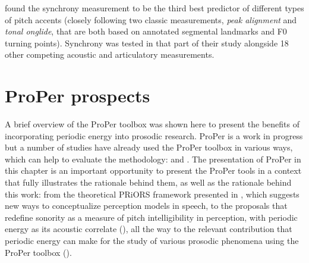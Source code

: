 \citet{roessig2022tracing} found the synchrony measurement to be the third best predictor of different types of pitch accents (closely following two classic measurements, \textit{peak alignment} and \textit{tonal onglide}, that are both based on annotated segmental landmarks and F0 turning points). 
Synchrony was tested in that part of their  study alongside 18 other competing acoustic and articulatory measurements.


\section{ProPer prospects}\label{sec:prospects}

A brief overview of the ProPer toolbox was shown here to present the benefits of incorporating periodic energy into prosodic research. ProPer is a work in progress but a number of studies have already used the ProPer toolbox in various ways, which can help to evaluate the methodology: \citet{albert2018usingsk, albert2018tonalsk, albert2019cansk, albert2022improved, cangemi2019modellingsk, ventura2019perceptualsk, Lialiou2021periodicsk, savino2021nativesk, jeon2022investigating, sbranna2023prosodic} %
and
\citet{roessig2022tracing}.  %
The presentation of ProPer in this chapter is an important opportunity to present the ProPer tools in a context that fully illustrates the rationale behind them, as well as the rationale behind this work: from the theoretical PRiORS framework presented in , which suggests new ways to conceptualize perception models in speech, to the proposals that redefine sonority as a measure of pitch intelligibility in perception, with periodic energy as its acoustic correlate (),
all the way to the relevant contribution that periodic energy can make for the study of various prosodic phenomena using the ProPer toolbox ().
